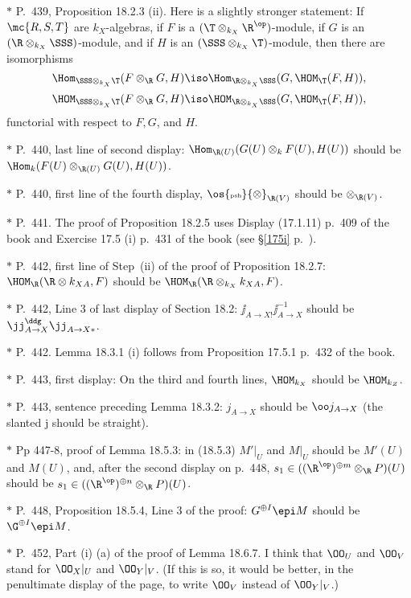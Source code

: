 \documentclass[12pt]{article}
\theoremstyle{remark}
\theoremstyle{definition}
\begin{document}
\nn$*$ P.~439, Proposition 18.2.3 (ii). Here is a slightly stronger statement: If $\mc{R,S,T}$ are $k_X$-algebras, if $F$ is a $(\T\otimes_{k_X}\R^{\op})$-module, if $G$ is an $(\R\otimes_{k_X}\SSS)$-module, and if $H$ is an $(\SSS\otimes_{k_X}\T)$-module, then there are isomorphisms 
$$
\Hom_{\SSS\otimes_{k_X}\T}(F\otimes_\R G,H)\iso
\Hom_{\R\otimes_{k_X}\SSS}(G,\HOM_\T(F,H)), 
$$ 
$$
\HOM_{\SSS\otimes_{k_X}\T}(F\otimes_\R G,H)\iso
\HOM_{\R\otimes_{k_X}\SSS}(G,\HOM_\T(F,H)), 
$$ 
functorial with respect to $F,G$, and $H$.

\nn$*$ P.~440, last line of second display: $\Hom_{\R(U)}(G(U)\otimes_kF(U),H(U))$ should be $\Hom_k(F(U)\otimes_{\R(U)}G(U),H(U))$. 

\nn$*$ P.~440, first line of the fourth display, $\os{\text{\tiny psh}}{\otimes}_{\R(V)}$ should be $\otimes_{\R(V)}$. 

\nn$*$ P.~441. The proof of Proposition 18.2.5 uses Display (17.1.11) p.~409 of the book and Exercise 17.5 (i) p.~431 of the book (see \S\ref{175i} p.~).  

\nn$*$ P.~442, first line of Step~(ii) of the proof of Proposition 18.2.7: $\HOM_\R(\R\otimes k_{XA},F)$ should be $\HOM_\R(\R\otimes_{k_X}k_{XA},F)$. 

\nn$*$ P.~442, Line 3 of last display of Section 18.2: $\jj_{A\to X!}\jj_{A\to X}^{-1}$ should be $\jj_{A\to X}^\ddg\jj_{A\to X*}$. 

\nn$*$ P.~442. Lemma 18.3.1 (i) follows from Proposition 17.5.1 p.~432 of the book. 

\nn$*$ P.~443, first display: On the third and fourth lines, $\HOM_{k_X}$ should be $\HOM_{k_Z}$. 

\nn$*$ P.~443, sentence preceding Lemma 18.3.2: $j_{A\to X}$ should be $\oo j_{A\to X}$ (the slanted j should be straight). 

\nn$*$ Pp 447-8, proof of Lemma 18.5.3: in (18.5.3) $M'|_U$ and $M|_U$ should be $M'(U)$ and $M(U)$, and, after the second display on p.~448, $s_1\in((\R^{\op})^{\oplus m}\otimes_\R P)(U)$ should be $s_1\in((\R^{\op})^{\oplus n}\otimes_\R P)(U)$.

\nn$*$ P.~448, Proposition 18.5.4, Line 3 of the proof: $G^{\oplus I}\epi M$ should be $\G^{\oplus I}\epi M$.

\nn$*$ P.~452, Part (i) (a) of the proof of Lemma 18.6.7. I think that $\OO_U$ and $\OO_V$ stand for $\OO_X|_U$ and $\OO_Y|_V$. (If this is so, it would be better, in the penultimate display of the page, to write $\OO_V$ instead of $\OO_Y|_V$.) 
\end{document}
